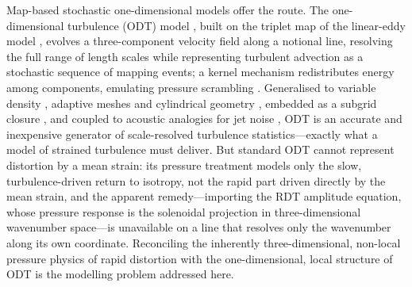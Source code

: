 \documentclass[11pt,a4paper]{article}
\begin{document}
Map-based stochastic one-dimensional models offer the route. The
one-dimensional turbulence (ODT) model
\citep{Kerstein1999,Kerstein2001}, built on the triplet map of the
linear-eddy model \citep{Kerstein1991}, evolves a three-component
velocity field along a notional line, resolving the full range of length
scales while representing turbulent advection as a stochastic sequence
of mapping events; a kernel mechanism redistributes energy among
components, emulating pressure scrambling
\citep{WunschKerstein2001,Kerstein2001}. Generalised to variable density
\citep{AshurstKerstein2005}, adaptive meshes \citep{Lignell2013,
StephensLignell2021} and cylindrical geometry \citep{Lignell2018},
embedded as a subgrid closure \citep{SchmidtKerstein2010}, and coupled
to acoustic analogies for jet noise
\citep{SharmaKleinSchmidt2022,MedinaMendez2023}, ODT is an accurate and
inexpensive generator of scale-resolved turbulence statistics---exactly
what a model of strained turbulence must deliver. But standard ODT
cannot represent distortion by a mean strain: its pressure treatment
models only the slow, turbulence-driven return to isotropy, not the
rapid part driven directly by the mean strain, and the
apparent remedy---importing the RDT amplitude equation, whose pressure
response is the solenoidal projection in three-dimensional wavenumber
space---is unavailable on a line that resolves only the wavenumber along
its own coordinate. Reconciling the inherently three-dimensional, non-local pressure physics
of rapid distortion with the one-dimensional, local structure of ODT is the
modelling problem addressed here.
\end{document}
